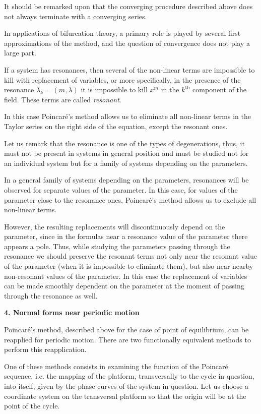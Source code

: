 \documentclass[12pt]{amsart}
\begin{document}
It should be remarked upon that the converging procedure described above does
not always terminate with a converging series.

In applications of bifurcation theory, a primary role is played by several first
approximations of the method, and the question of convergence does not play a
large part.

If a system has resonances, then several of the non-linear terms are impossible
to kill with replacement of variables, or more specifically, in the presence of
the resonance $\lambda_k=(m,\lambda)$ it is impossible to kill $x^m$ in the
$k^\text{th}$ component of the field.
These terms are called \textit{resonant}.

In this case Poincar\'e's method allows us to eliminate all non-linear terms in
the Taylor series on the right side of the equation, except the resonant ones.

Let us remark that the resonance is one of the types of degenerations, thus, it
must not be present in systems in general position and must be studied not for
an individual system but for a family of systems depending on the parameters.

In a general family of systems depending on the parameters, resonances will be
observed for separate values of the parameter.
In this case, for values of the parameter close to the resonance ones,
Poincar\'e's method allows us to exclude all non-linear terms.

However, the resulting replacements will discontinuously depend on the
parameter, since in the formulas near a resonance value of the parameter there
appears a pole.
Thus, while studying the parameters passing through the resonance we should
preserve the resonant terms not only near the resonant value of the parameter
(when it is impossible to eliminate them), but also near nearby non-resonant
values of the parameter.
In this case the replacement of variables can be made smoothly dependent on the
parameter at the moment of passing through the resonance as well.\\

\centerline{\textbf{4. Normal forms near periodic motion}}
\vspace{1em}
Poincar\'e's method, described above for the case of point of equilibrium, can
be reapplied for periodic motion.
There are two functionally equivalent methods to perform this reapplication.

One of these methods consists in examining the function of the Poincar\'e
sequence, i.e. the mapping of the platform, transversally to the cycle in
question, into itself, given by the phase curves of the system in question.
Let us choose a coordinate system on the transversal platform so that the origin
will be at the point of the cycle.
\end{document}
